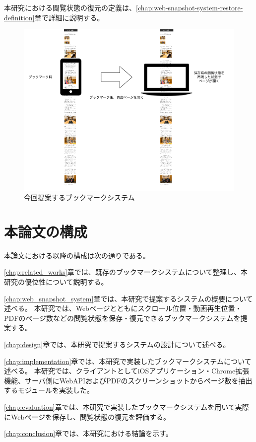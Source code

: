 本研究における閲覧状態の復元の定義は、\ref{chap:web-snapshot-system-restore-definition}章で詳細に説明する。

\begin{figure}[htbp]
  \caption{今回提案するブックマークシステム}
  \label{fig:ideal-scroll-position}
  \begin{center}
    \includegraphics[bb=0 0 681 641,width=15cm]{img/010_introduction/ideal-scroll-position.pdf}
  \end{center}
\end{figure}

\section{本論文の構成}

本論文における以降の構成は次の通りである。

\ref{chap:related_works}章では、既存のブックマークシステムについて整理し、本研究の優位性について説明する。

\ref{chap:web_snapshot_system}章では、本研究で提案するシステムの概要について述べる。
本研究では、Webページとともにスクロール位置・動画再生位置・PDFのページ数などの閲覧状態を保存・復元できるブックマークシステムを提案する。

\ref{chap:design}章では、本研究で提案するシステムの設計について述べる。

\ref{chap:implementation}章では、本研究で実装したブックマークシステムについて述べる。
本研究では、クライアントとしてiOSアプリケーション・Chrome拡張機能、サーバ側にWebAPIおよびPDFのスクリーンショットからページ数を抽出するモジュールを実装した。

\ref{chap:evaluation}章では、本研究で実装したブックマークシステムを用いて実際にWebページを保存し、閲覧状態の復元を評価する。

\ref{chap:conclusion}章では、本研究における結論を示す。